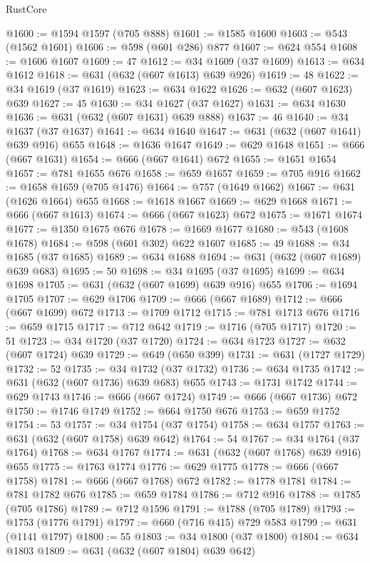 \begin{lexlean}{RustCore}
\begin{coremodule}
@1600 := @1594 @1597 (@705 @888)
@1601 := @1585 @1600
@1603 := @543 (@1562 @1601)
@1606 := @598 (@601 @286) @877
@1607 := @624 @554
@1608 := @1606 @1607
@1609 := 47
@1612 := @34 @1609 (@37 @1609)
@1613 := @634 @1612
@1618 := @631 (@632 (@607 @1613) @639 @926)
@1619 := 48
@1622 := @34 @1619 (@37 @1619)
@1623 := @634 @1622
@1626 := @632 (@607 @1623) @639
@1627 := 45
@1630 := @34 @1627 (@37 @1627)
@1631 := @634 @1630
@1636 := @631 (@632 (@607 @1631) @639 @888)
@1637 := 46
@1640 := @34 @1637 (@37 @1637)
@1641 := @634 @1640
@1647 := @631 (@632 (@607 @1641) @639 @916) @655
@1648 := @1636 @1647
@1649 := @629 @1648
@1651 := @666 (@667 @1631)
@1654 := @666 (@667 @1641) @672
@1655 := @1651 @1654
@1657 := @781 @1655 @676
@1658 := @659 @1657
@1659 := @705 @916
@1662 := @1658 @1659 (@705 @1476)
@1664 := @757 (@1649 @1662)
@1667 := @631 (@1626 @1664) @655
@1668 := @1618 @1667
@1669 := @629 @1668
@1671 := @666 (@667 @1613)
@1674 := @666 (@667 @1623) @672
@1675 := @1671 @1674
@1677 := @1350 @1675 @676
@1678 := @1669 @1677
@1680 := @543 (@1608 @1678)
@1684 := @598 (@601 @302) @622 @1607
@1685 := 49
@1688 := @34 @1685 (@37 @1685)
@1689 := @634 @1688
@1694 := @631 (@632 (@607 @1689) @639 @683)
@1695 := 50
@1698 := @34 @1695 (@37 @1695)
@1699 := @634 @1698
@1705 := @631 (@632 (@607 @1699) @639 @916) @655
@1706 := @1694 @1705
@1707 := @629 @1706
@1709 := @666 (@667 @1689)
@1712 := @666 (@667 @1699) @672
@1713 := @1709 @1712
@1715 := @781 @1713 @676
@1716 := @659 @1715
@1717 := @712 @642
@1719 := @1716 (@705 @1717)
@1720 := 51
@1723 := @34 @1720 (@37 @1720)
@1724 := @634 @1723
@1727 := @632 (@607 @1724) @639
@1729 := @649 (@650 @399)
@1731 := @631 (@1727 @1729)
@1732 := 52
@1735 := @34 @1732 (@37 @1732)
@1736 := @634 @1735
@1742 := @631 (@632 (@607 @1736) @639 @683) @655
@1743 := @1731 @1742
@1744 := @629 @1743
@1746 := @666 (@667 @1724)
@1749 := @666 (@667 @1736) @672
@1750 := @1746 @1749
@1752 := @664 @1750 @676
@1753 := @659 @1752
@1754 := 53
@1757 := @34 @1754 (@37 @1754)
@1758 := @634 @1757
@1763 := @631 (@632 (@607 @1758) @639 @642)
@1764 := 54
@1767 := @34 @1764 (@37 @1764)
@1768 := @634 @1767
@1774 := @631 (@632 (@607 @1768) @639 @916) @655
@1775 := @1763 @1774
@1776 := @629 @1775
@1778 := @666 (@667 @1758)
@1781 := @666 (@667 @1768) @672
@1782 := @1778 @1781
@1784 := @781 @1782 @676
@1785 := @659 @1784
@1786 := @712 @916
@1788 := @1785 (@705 @1786)
@1789 := @712 @1596
@1791 := @1788 (@705 @1789)
@1793 := @1753 (@1776 @1791)
@1797 := @660 (@716 @415) @729 @583
@1799 := @631 (@1141 @1797)
@1800 := 55
@1803 := @34 @1800 (@37 @1800)
@1804 := @634 @1803
@1809 := @631 (@632 (@607 @1804) @639 @642)

\end{coremodule}
\end{lexlean}
